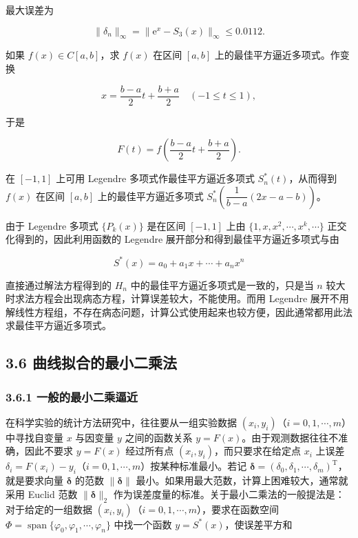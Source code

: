 \documentclass[
  10pt,
  fontset=fandol]{ctexart}
\begin{document}
最大误差为

\[
\|\delta_n\|_\infty=\|\mathrm e^x-S_3(x)\|_\infty\leqslant0.0112.
\]

如果 \(f(x)\in C[a,b]\)，求 \(f(x)\) 在区间 \([a,b]\) 上的最佳平方逼近多项式。作变换

\[
x=\frac{b-a}{2}t+\frac{b+a}{2}\quad(-1\leqslant t\leqslant1),
\]

于是

\[
F(t)=f\left(\frac{b-a}{2}t+\frac{b+a}{2}\right).
\]

在 \([-1,1]\) 上可用 Legendre 多项式作最佳平方逼近多项式 \(S_n^*(t)\)，从而得到 \(f(x)\) 在区间 \([a,b]\) 上的最佳平方逼近多项式 \(S_n^*\left(\dfrac1{b-a}(2x-a-b)\right)\)。

由于 Legendre 多项式 \(\{P_k(x)\}\) 是在区间 \([-1,1]\) 上由 \(\{1,\allowbreak x,\allowbreak x^2,\allowbreak \cdots,\allowbreak x^k,\allowbreak \cdots\}\) 正交化得到的，因此利用函数的 Legendre 展开部分和得到最佳平方逼近多项式与由

\[
S^*(x)=a_0+a_1x+\cdots+a_nx^n
\]

直接通过解法方程得到的 \(H_n\) 中的最佳平方逼近多项式是一致的，只是当 \(n\) 较大时求法方程会出现病态方程，计算误差较大，不能使用。而用 Legendre 展开不用解线性方程组，不存在病态问题，计算公式使用起来也较方便，因此通常都用此法求最佳平方逼近多项式。

\subsection{3.6 曲线拟合的最小二乘法}\label{ux66f2ux7ebfux62dfux5408ux7684ux6700ux5c0fux4e8cux4e58ux6cd5}

\subsubsection{3.6.1 一般的最小二乘逼近}\label{ux4e00ux822cux7684ux6700ux5c0fux4e8cux4e58ux903cux8fd1}

在科学实验的统计方法研究中，往往要从一组实验数据 \((x_i,y_i)\)（\(i=0,1,\cdots,m\)）中寻找自变量 \(x\) 与因变量 \(y\) 之间的函数关系 \(y=F(x)\)。由于观测数据往往不准确，因此不要求 \(y=F(x)\) 经过所有点 \((x_i,y_i)\)，而只要求在给定点 \(x_i\) 上误差 \(\delta_i=F(x_i)-y_i\)（\(i=0,1,\cdots,m\)）按某种标准最小。若记 \(\boldsymbol\delta=(\delta_0,\delta_1,\cdots,\delta_m)^{\mathrm T}\)，就是要求向量 \(\boldsymbol\delta\) 的范数 \(\|\boldsymbol\delta\|\) 最小。如果用最大范数，计算上困难较大，通常就采用 Euclid 范数 \(\|\boldsymbol\delta\|_2\) 作为误差度量的标准。关于最小二乘法的一般提法是：对于给定的一组数据 \((x_i,y_i)\)（\(i=0,1,\cdots,m\)），要求在函数空间 \(\Phi=\operatorname{span}\{\varphi_0,\varphi_1,\cdots,\varphi_n\}\) 中找一个函数 \(y=S^*(x)\)，使误差平方和
\end{document}
